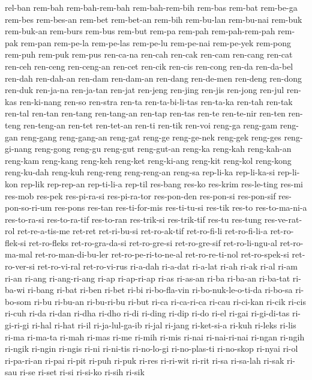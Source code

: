 {rel-ban rem-bah rem-bah-rem-bah rem-bah-rem-bih rem-bas rem-bat rem-be-ga
rem-bes rem-bes-an rem-bet rem-bet-an rem-bih rem-bu-lan rem-bu-nai
rem-buk rem-buk-an rem-burs rem-bus rem-but rem-pa rem-pah rem-pah-rem-pah
rem-pak rem-pan rem-pe-la rem-pe-las rem-pe-lu rem-pe-nai rem-pe-yek
rem-pong rem-puh rem-puk rem-pus ren-ca-na ren-cah ren-cak ren-cam
ren-cang ren-cat ren-ceh ren-ceng ren-ceng-an ren-cet ren-cik ren-cis
ren-cong ren-da ren-da-bel ren-dah ren-dah-an ren-dam ren-dam-an ren-dang
ren-de-men ren-deng ren-dong ren-duk ren-ja-na ren-ja-tan ren-jat ren-jeng
ren-jing ren-jis ren-jong ren-jul ren-kas ren-ki-nang ren-so ren-stra
ren-ta ren-ta-bi-li-tas ren-ta-ka ren-tah ren-tak ren-tal ren-tan ren-tang
ren-tang-an ren-tap ren-tas ren-te ren-te-nir ren-ten ren-teng ren-teng-an
ren-tet ren-tet-an ren-ti ren-tik ren-voi reng-ga reng-gam reng-gan
reng-gang reng-gang-an reng-gat reng-ge reng-ge-nek reng-gek reng-ges
reng-gi-nang reng-gong reng-gu reng-gut reng-gut-an reng-ka reng-kah
reng-kah-an reng-kam reng-kang reng-keh reng-ket reng-ki-ang reng-kit
reng-kol reng-kong reng-ku-dah reng-kuh reng-reng reng-reng-an reng-sa
rep-li-ka rep-li-ka-si rep-li-kon rep-lik rep-rep-an rep-ti-li-a rep-til
res-bang res-ko res-krim res-le-ting res-mi res-mob res-pek res-pi-ra-si
res-pi-ra-tor res-pon-den res-pon-si res-pon-sif res-pon-so-ri-um res-pons
res-tan res-ti-for-mis res-ti-tu-si res-tik res-to res-to-ma-ni-a
res-to-ra-si res-to-ra-tif res-to-ran res-trik-si res-trik-tif res-tu
res-tung res-ve-rat-rol ret-re-a-tis-me ret-ret ret-ri-bu-si ret-ro-ak-tif
ret-ro-fi-li ret-ro-fi-li-a ret-ro-flek-si ret-ro-fleks ret-ro-gra-da-si
ret-ro-gre-si ret-ro-gre-sif ret-ro-li-ngu-al ret-ro-ma-mal
ret-ro-man-di-bu-ler ret-ro-pe-ri-to-ne-al ret-ro-re-ti-nol ret-ro-spek-si
ret-ro-ver-si ret-ro-vi-ral ret-ro-vi-rus ri-a-dah ri-a-dat ri-a-lat ri-ah
ri-ak ri-al ri-am ri-an ri-ang ri-ang-ri-ang ri-ap ri-ap-ri-ap ri-as
ri-as-an ri-ba ri-ba-an ri-ba-tat ri-ba-wi ri-bang ri-bat ri-ben ri-bet
ri-bi ri-bo-fla-vin ri-bo-nuk-le-o-ti-da ri-bo-sa ri-bo-som ri-bu ri-bu-an
ri-bu-ri-bu ri-but ri-ca ri-ca-ri-ca ri-cau ri-ci-kan ri-cik ri-cis ri-cuh
ri-da ri-dan ri-dha ri-dho ri-di ri-ding ri-dip ri-do ri-el ri-gai
ri-gi-di-tas ri-gi-ri-gi ri-hal ri-hat ri-il ri-ja-lul-ga-ib ri-jal
ri-jang ri-ket-si-a ri-kuh ri-leks ri-lis ri-ma ri-ma-ta ri-mah ri-mas
ri-me ri-mih ri-mis ri-nai ri-nai-ri-nai ri-ngan ri-ngih ri-ngik ri-ngin
ri-ngis ri-ni ri-ni-tis ri-no-lo-gi ri-no-plas-ti ri-no-skop ri-nyai ri-ol
ri-pa-ri-an ri-pai ri-pit ri-puh ri-puk ri-res ri-ri-wit ri-rit ri-sa
ri-sa-lah ri-sak ri-sau ri-se ri-set ri-si ri-si-ko ri-sih ri-sik
}
